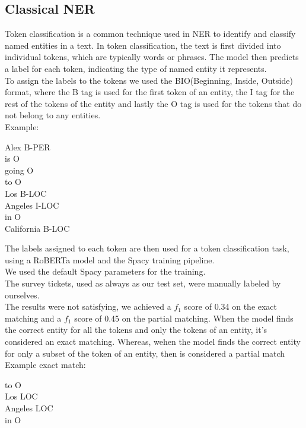 \subsection{Classical NER}
Token classification is a common technique used in NER to identify and classify named entities in a text. In token classification, the text is first divided into individual tokens, which are typically words or phrases. The model then predicts a label for each token, indicating the type of named entity it represents.\\
To assign the labels to the tokens we used the BIO(Beginning, Inside, Outside) format, where the B tag is used for the first token of an entity, the I tag for the rest of the tokens of the entity and lastly the O tag is used for the tokens that do not belong to any entities. \\
Example:
\begin{adjustwidth}{1cm}{}
    Alex B-PER\\
    is O\\
    going O\\
    to O\\
    Los B-LOC\\
    Angeles I-LOC\\
    in O\\
    California B-LOC
\end{adjustwidth}
The labels assigned to each token are then used for a token classification task, using a RoBERTa model and the Spacy training pipeline. \\
We used the default Spacy parameters for the training. \\
The survey tickets, used as always as our test set, were manually labeled by ourselves. \\
The results were not satisfying, we achieved a $f_1$ score of 0.34 on the exact matching and a $f_1$ score of 0.45 on the partial matching. When the model finds the correct entity for all the tokens and only the tokens of an entity, it's considered an exact matching. Whereas, wehen the model finds the correct entity for only a subset of the token of an entity, then is considered a partial match\\
Example exact match:
\begin{adjustwidth}{1cm}{}
    to O\\
    Los LOC\\
    Angeles LOC\\
    in O\\
\end{adjustwidth}
